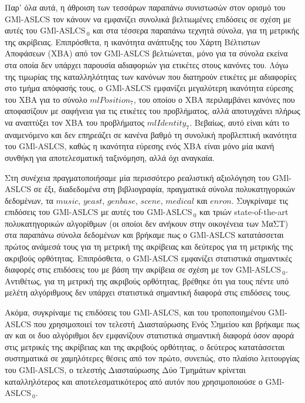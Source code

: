 Παρ' όλα αυτά, η άθροιση των τεσσάρων παραπάνω συνιστωσών στον ορισμό του GMl-ASLCS τον κάνουν να εμφανίζει συνολικά βελτιωμένες επιδόσεις σε σχέση με αυτές του GMl-ASLCS$_{\:0}$ και στα τέσσερα παραπάνω τεχνητά σύνολα, για τη μετρικής της ακρίβειας. Επιπρόσθετα, η ικανότητα ανάπτυξης του Χάρτη Βέλτιστων Αποφάσεων (ΧΒΑ) από τον GMl-ASLCS βελτιώνεται, μόνο για τα σύνολα εκείνα στα οποία δεν υπάρχει παρουσία αδιαφοριών για ετικέτες στους κανόνες του. Λόγω της τιμωρίας της καταλληλότητας των κανόνων που διατηρούν ετικέτες με αδιαφορίες στο τμήμα απόφασής τους, ο GMl-ASLCS εμφανίζει μεγαλύτερη ικανότητα εύρεσης του ΧΒΑ για το σύνολο $mlPosition_{7}$, του οποίου ο ΧΒΑ περιλαμβάνει κανόνες που αποφασίζουν με σαφήνεια για τις ετικέτες του προβλήματος, αλλά αποτυγχάνει πλήρως να αναπτύξει τον ΧΒΑ του προβλήματος $mlIdentity_{7}$. Βεβαίως, αυτό είναι κάτι το αναμενόμενο και δεν επηρεάζει σε κανένα βαθμό τη συνολική προβλεπτική ικανότητα του GMl-ASLCS, καθώς η ικανότητα εύρεσης ενός ΧΒΑ είναι μόνο μία ικανή συνθήκη για αποτελεσματική ταξινόμηση, αλλά όχι αναγκαία.

Στη συνέχεια πραγματοποιήσαμε μία περισσότερο ρεαλιστική αξιολόγηση του GMl-ASLCS σε έξι, διαδεδομένα στη βιβλιογραφία, πραγματικά σύνολα πολυκατηγορικών δεδομένων, τα $music$, $yeast$, $genbase$, $scene$, $medical$ και $enron$. Συγκρίναμε τις επιδόσεις του GMl-ASLCS με αυτές του GMl-ASLCS$_{\:0}$ και τριών state-of-the-art πολυκατηγορικών αλγορίθμων (οι οποίοι δεν ανήκουν στην οικογένεια των ΜαΣΤ) στα παραπάνω σύνολα δεδομένων και βρήκαμε πως ο GMl-ASLCS κατατάσσεται πρώτος ανάμεσά τους για τη μετρική της ακρίβειας και δεύτερος για τη μετρικής της ακριβούς ορθότητας. Επιπρόσθετα, ο GMl-ASLCS εμφανίζει στατιστικά σημαντικές διαφορές στις επιδόσεις του με βάση την ακρίβεια σε σχέση με τον GMl-ASLCS$_{\:0}$. Αντιθέτως, για τη μετρική της ακριβούς ορθότητας, βρέθηκε ότι για τους πέντε υπό μελέτη αλγόριθμους δεν υπάρχει στατιστικά σημαντική διαφορά στις επιδόσεις τους. 

Ακόμα, συγκρίναμε τις επιδόσεις του GMl-ASLCS, και του τροποποιημένου GMl-ASLCS που χρησιμοποιεί τον τελεστή Διασταύρωσης Ενός Σημείου και βρήκαμε πως αν και οι δυο αλγόριθμοι δεν εμφανίζουν στατιστικά σημαντική διαφορά όσον αφορά στις μετρικές της ακρίβειας και της ακριβούς ορθότητας, ο δεύτερος κατατάσσεται συστηματικά σε χαμηλότερες θέσεις από τον πρώτο, συνεπώς, στο πλαίσιο λειτουργίας του GMl-ASLCS, ο τελεστής Διασταύρωσης Δύο Τμημάτων κρίνεται καταλληλότερος και αποτελεσματικότερος από αυτόν που χρησιμοποιούσε ο GMl-ASLCS$_{\:0}$.

